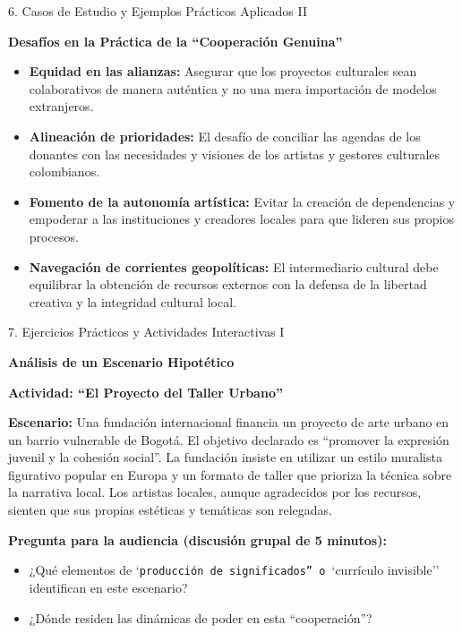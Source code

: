 \documentclass[aspectratio=169]{beamer}
\begin{document}
\begin{frame}[fragile]{6. Casos de Estudio y Ejemplos Prácticos Aplicados II}


\textbf{Desafíos en la Práctica de la ``Cooperación Genuina''}

\begin{itemize}
  \item \textbf{Equidad en las alianzas:} Asegurar que los proyectos culturales sean colaborativos de manera auténtica y no una mera importación de modelos extranjeros.
  \item \textbf{Alineación de prioridades:} El desafío de conciliar las agendas de los donantes con las necesidades y visiones de los artistas y gestores culturales colombianos.
  \item \textbf{Fomento de la autonomía artística:} Evitar la creación de dependencias y empoderar a las instituciones y creadores locales para que lideren sus propios procesos.
  \item \textbf{Navegación de corrientes geopolíticas:} El intermediario cultural debe equilibrar la obtención de recursos externos con la defensa de la libertad creativa y la integridad cultural local.
\end{itemize}
\end{frame}



\begin{frame}[fragile]{7. Ejercicios Prácticos y Actividades Interactivas I}


\textbf{Análisis de un Escenario Hipotético}

\textbf{Actividad: ``El Proyecto del Taller Urbano''}

\textbf{Escenario:}
Una fundación internacional financia un proyecto de arte urbano en un barrio vulnerable de Bogotá. El objetivo declarado es ``promover la expresión juvenil y la cohesión social''. La fundación insiste en utilizar un estilo muralista figurativo popular en Europa y un formato de taller que prioriza la técnica sobre la narrativa local. Los artistas locales, aunque agradecidos por los recursos, sienten que sus propias estéticas y temáticas son relegadas.

\textbf{Pregunta para la audiencia (discusión grupal de 5 minutos):}

\begin{itemize}
  \item ¿Qué elementos de `\texttt{producción de significados'' o }`currículo invisible'' identifican en este escenario?
  \item ¿Dónde residen las dinámicas de poder en esta ``cooperación''?
\end{itemize}
\end{frame}
\end{document}
